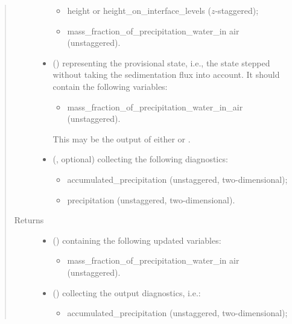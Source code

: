 \documentclass[letterpaper,10pt,english]{sphinxmanual}
\begin{document}
\begin{fulllineitems}
\begin{fulllineitems}
\begin{quote}
\begin{description}
\begin{itemize}
\begin{itemize}
\item {} 
height or height\_on\_interface\_levels (\(z\)-staggered);

\item {} 
mass\_fraction\_of\_precipitation\_water\_in air (unstaggered).

\end{itemize}


\item {} 
 () \textendash{} 
 representing the provisional state, i.e.,
the state stepped without taking the sedimentation flux into account.
It should contain the following variables:
\begin{itemize}
\item {} 
mass\_fraction\_of\_precipitation\_water\_in\_air (unstaggered).

\end{itemize}

This may be the output of either
 or
.


\item {} 
 (, optional) \textendash{} 
 collecting the following diagnostics:
\begin{itemize}
\item {} 
accumulated\_precipitation (unstaggered, two-dimensional);

\item {} 
precipitation (unstaggered, two-dimensional).

\end{itemize}


\end{itemize}

\item[{Returns}] \leavevmode
\begin{itemize}
\item {} 
 () \textendash{}  containing the following updated variables:
\begin{itemize}
\item {} 
mass\_fraction\_of\_precipitation\_water\_in air (unstaggered).

\end{itemize}

\item {} 
 () \textendash{}  collecting the output diagnostics, i.e.:
\begin{itemize}
\item {} 
accumulated\_precipitation (unstaggered, two-dimensional);


\end{itemize}
\end{itemize}
\end{description}
\end{quote}
\end{fulllineitems}
\end{fulllineitems}
\end{document}
